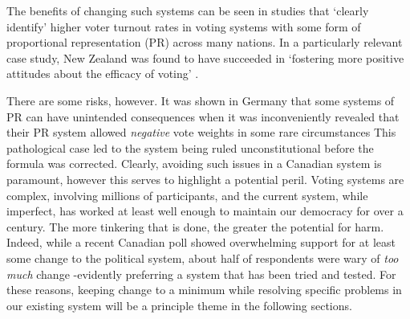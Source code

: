 

The benefits of changing such systems can be seen in studies that `clearly identify' higher voter turnout rates in voting systems with some form of proportional representation (PR) \cite{Blais}
 across many nations. In a particularly relevant case study, New Zealand was found to have succeeded in `fostering more positive attitudes about the efficacy of voting' \cite{NZ_PR_results}.

There are some risks, however. It was shown in Germany that some systems of PR can have unintended consequences when it was inconveniently revealed that their PR system allowed \emph{negative} vote weights in some rare circumstances\cite{Die_Zeit_negative_vote} 
This pathological case led to the system being ruled unconstitutional before the formula was corrected. 
Clearly, avoiding such issues in a Canadian system is paramount, however this serves to highlight a potential peril.
Voting systems are complex, involving millions of participants, and the current system, while imperfect, has worked at least well enough to maintain our democracy for over a century. 
The more tinkering that is done, the greater the potential for harm. 
Indeed, while a recent Canadian poll\cite{Broadbent_poll} showed overwhelming support for at least some change to the political system, about half of respondents were wary of \emph{too much} change \--evidently preferring a system that has been tried and tested. 
For these reasons, keeping change to a minimum while resolving specific problems in our existing system will be a principle theme in the following sections.


